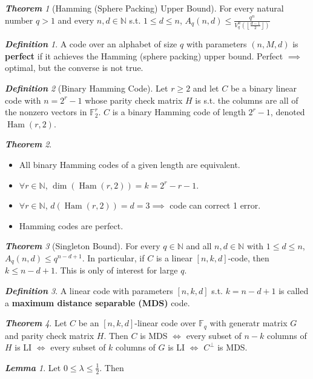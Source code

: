 \documentclass[frenchspacing,9pt,landscape,a4paper]{article}
\newcommand{\BF}{\mathbb F}
\newcommand{\BN}{\mathbb N}
\newcommand{\tb}[1]{\textbf {#1}}
\newcommand{\floor}[1]{\left\lfloor #1 \right\rfloor}
\DeclareMathOperator{\ham}{Ham}
\theoremstyle{remark}
\newtheorem*{thm}{\textbf{Theorem}}
\newtheorem*{defn}{\textbf{Definition}}
\newtheorem*{lem}{\textbf{Lemma}}
\begin{document}
\begin{multicols}{4}
\begin{thm}[Hamming (Sphere Packing) Upper Bound]
    For every natural number $q>1$ and every  $n,d\in\BN$ s.t.  $1\leq d\leq n$,  $A_q(n,d)\leq
    \frac{q^n}{V_q^n\left(\floor{\frac{d-1}{2}}\right)}$
\end{thm}
\begin{defn}
    A code over an alphabet of size  $q$ with parameters  $(n,M,d)$ is \textbf{perfect} if it achieves the
    Hamming (sphere packing) upper bound. Perfect  $\implies$ optimal, but the converse is not true.
\end{defn}
\begin{defn}[Binary Hamming Code]
    Let $r\geq 2$ and let  $C$ be a binary linear code with  $n=2^r-1$ whose parity check matrix  $H$ is
    s.t. the columns are all of the nonzero vectors in  $\BF_2^r$.  $C$ is a binary Hamming code of length 
    $2^r-1$, denoted  $\ham(r,2)$.
\end{defn}
\begin{thm}
    \begin{itemize}
        \item All binary Hamming codes of a given length are equivalent.
        \item $\forall r\in\BN$,  $\dim(\ham(r,2))=k=2^r-r-1$.
        \item $\forall r\in\BN$,  $d(\ham(r,2))=d=3\implies$ code can correct 1 error.
        \item  Hamming codes are perfect.
    \end{itemize}
\end{thm}
\begin{thm}[Singleton Bound]
    For every $q\in\BN$ and all  $n,d\in\BN$ with  $1\leq d\leq n$,  $A_q(n,d)\leq q^{n-d+1}$. In
    particular, if  $C$ is a linear  $[n,k,d]$-code, then  $k\leq n-d+1$. This is only of interest for
    large $q$.
\end{thm}
\begin{defn}
    A linear code with parameters $[n,k,d]$ s.t.  $k=n-d+1$ is called a \tb{maximum distance separable
    (MDS)} code.
\end{defn}
\begin{thm}
    Let $C$ be an  $[n,k,d]$-linear code over  $\BF_q$ with generatr matrix  $G$ and parity check matrix
    $H$. Then $C$ is MDS  $\iff$ every subset of $n-k$ columns of  $H$ is LI $\iff$ every subset of  $k$
    columns of  $G$ is LI $\iff$ $C^\perp$ is MDS.
\end{thm}
\begin{lem}
    Let $0\leq\lambda\leq \frac{1}{2}$. Then
    \begin{align*}

\end{align*}
\end{lem}
\end{multicols}
\end{document}

